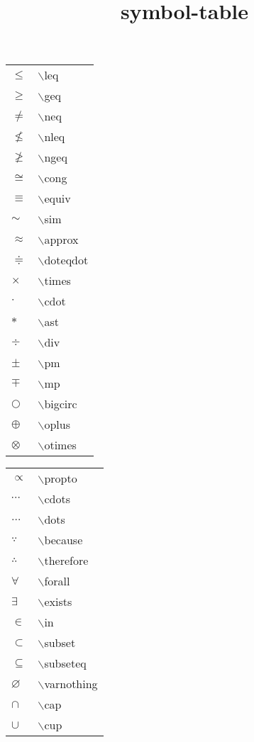 \documentclass[10pt]{beamer}
\title{symbol-table}
\begin{document}
\begin{frame}
\begin{tabular}{ll}
$\leq$ &  $\backslash$leq \\
$\geq$ &  $\backslash$geq \\
$\neq$ &  $\backslash$neq \\
$\nleq$ &  $\backslash$nleq \\
$\ngeq$ &  $\backslash$ngeq \\
$\cong$ &  $\backslash$cong \\
$\equiv$ &  $\backslash$equiv \\
$\sim$ &  $\backslash$sim \\
$\approx$ &  $\backslash$approx \\
$\doteqdot$ &  $\backslash$doteqdot \\
$\times$ &  $\backslash$times \\
$\cdot $ &  $\backslash$cdot \\
$\ast $ &  $\backslash$ast \\
$\div$ &  $\backslash$div \\
$\pm$ &  $\backslash$pm \\
$\mp$ &  $\backslash$mp \\
$\bigcirc$ &  $\backslash$bigcirc \\
$\oplus$ &  $\backslash$oplus \\
$\otimes$ &  $\backslash$otimes \\
\end{tabular}
\hspace*{1ex}
\begin{tabular}{ll}
$\propto $ &  $\backslash$propto \\
$\cdots $ &  $\backslash$cdots \\
$\dots $ &  $\backslash$dots \\
$\because$ &  $\backslash$because \\
$\therefore$ &  $\backslash$therefore \\
$\forall$ &  $\backslash$forall \\
$\exists$ &  $\backslash$exists \\
$\in$ &  $\backslash$in \\
$\subset $ &  $\backslash$subset \\
$\subseteq $ &  $\backslash$subseteq \\
$\varnothing $ &  $\backslash$varnothing  \\
$\cap $ &  $\backslash$cap \\
$\cup $ &  $\backslash$cup \\

\end{tabular}
\end{frame}
\end{document}
